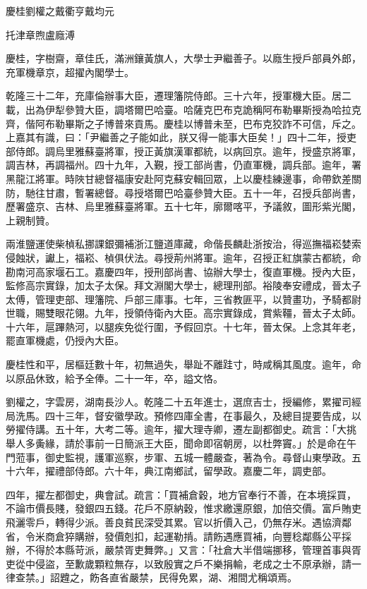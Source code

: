 
\begin{pinyinscope}
慶桂劉權之戴衢亨戴均元

托津章煦盧廕溥

慶桂，字樹齋，章佳氏，滿洲鑲黃旗人，大學士尹繼善子。以廕生授戶部員外郎，充軍機章京，超擢內閣學士。

乾隆三十二年，充庫倫辦事大臣，遷理籓院侍郎。三十六年，授軍機大臣。居二載，出為伊犁參贊大臣，調塔爾巴哈臺。哈薩克巴布克詭稱阿布勒畢斯授為哈拉克齊，偕阿布勒畢斯之子博普來貢馬。慶桂以博普未至，巴布克狡詐不可信，斥之。上嘉其有識，曰：「尹繼善之子能如此，朕又得一能事大臣矣！」四十二年，授吏部侍郎。調烏里雅蘇臺將軍，授正黃旗漢軍都統，以病回京。逾年，授盛京將軍，調吉林，再調福州。四十九年，入覲，授工部尚書，仍直軍機，調兵部。逾年，署黑龍江將軍。時陜甘總督福康安赴阿克蘇安輯回眾，上以慶桂練邊事，命帶欽差關防，馳往甘肅，暫署總督。尋授塔爾巴哈臺參贊大臣。五十一年，召授兵部尚書，歷署盛京、吉林、烏里雅蘇臺將軍。五十七年，廓爾喀平，予議敘，圖形紫光閣，上親制贊。

兩淮鹽運使柴楨私挪課銀彌補浙江鹽道庫藏，命偕長麟赴浙按治，得巡撫福崧婪索侵蝕狀，讞上，福崧、楨俱伏法。尋授荊州將軍。逾年，召授正紅旗蒙古都統，命勘南河高家堰石工。嘉慶四年，授刑部尚書、協辦大學士，復直軍機。授內大臣，監修高宗實錄，加太子太保。拜文淵閣大學士，總理刑部。裕陵奉安禮成，晉太子太傅，管理吏部、理籓院、戶部三庫事。七年，三省教匪平，以贊畫功，予騎都尉世職，賜雙眼花翎。九年，授領侍衛內大臣。高宗實錄成，賞紫韁，晉太子太師。十六年，扈蹕熱河，以腿疾免從行圍，予假回京。十七年，晉太保。上念其年老，罷直軍機處，仍授內大臣。

慶桂性和平，居樞廷數十年，初無過失，舉趾不離跬寸，時咸稱其風度。逾年，命以原品休致，給予全俸。二十一年，卒，謚文恪。

劉權之，字雲房，湖南長沙人。乾隆二十五年進士，選庶吉士，授編修，累擢司經局洗馬。四十三年，督安徽學政。預修四庫全書，在事最久，及總目提要告成，以勞擢侍講。五十年，大考二等。逾年，擢大理寺卿，遷左副都御史。疏言：「大挑舉人多夤緣，請於事前一日簡派王大臣，聞命即宿朝房，以杜弊竇。」於是命在午門蒞事，御史監視，護軍巡察，步軍、五城一體嚴查，著為令。尋督山東學政。五十六年，擢禮部侍郎。六十年，典江南鄉試，留學政。嘉慶二年，調吏部。

四年，擢左都御史，典會試。疏言：「買補倉穀，地方官奉行不善，在本境採買，不論市價長賤，發銀四五錢。花戶不原納穀，惟求繳還原銀，加倍交價。富戶賄吏飛灑零戶，轉得少派。善良貧民深受其累。官以折價入己，仍無存米。遇協濟鄰省，令米商倉猝購辦，發價剋扣，起運勒掯。請飭遇應買補，向豐稔鄰縣公平採辦，不得於本縣苛派，嚴禁胥吏舞弊。」又言：「社倉大半借端挪移，管理首事與胥吏從中侵盜，至歉歲顆粒無存，以致殷實之戶不樂捐輸，老成之士不原承辦，請一律查禁。」詔韙之，飭各直省嚴禁，民得免累，湖、湘間尤稱頌焉。


\end{pinyinscope}
